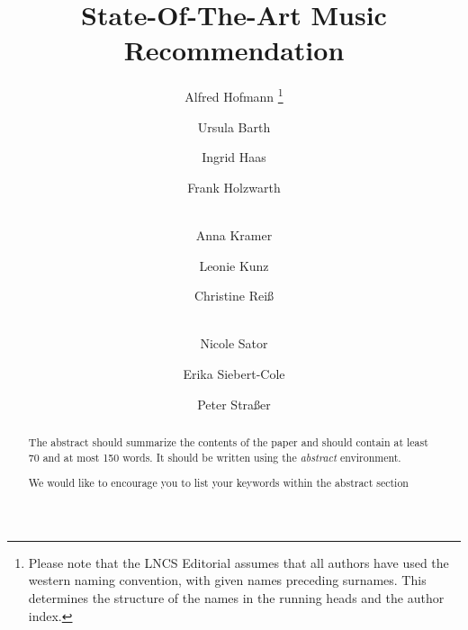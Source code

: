 \documentclass[runningheads,a4paper]{llncs}
\newcommand{\keywords}[1]{\par\addvspace\baselineskip
\noindent\keywordname\enspace\ignorespaces#1}
\begin{document}
\mainmatter  %

\title{State-Of-The-Art Music Recommendation}


%
%
\author{Alfred Hofmann%
\thanks{Please note that the LNCS Editorial assumes that all authors have used
the western naming convention, with given names preceding surnames. This determines
the structure of the names in the running heads and the author index.}%
\and Ursula Barth\and Ingrid Haas\and Frank Holzwarth\and\\
Anna Kramer\and Leonie Kunz\and Christine Rei\ss\and\\
Nicole Sator\and Erika Siebert-Cole\and Peter Stra\ss er}
%


%
%

\maketitle


\begin{abstract}
The abstract should summarize the contents of the paper and should
contain at least 70 and at most 150 words. It should be written using the
\emph{abstract} environment.
\keywords{We would like to encourage you to list your keywords within
the abstract section}
\end{abstract}
\end{document}
